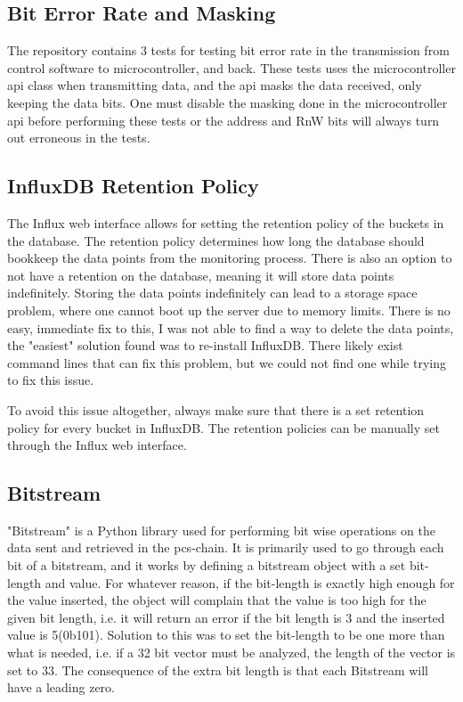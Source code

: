 \documentclass[main.tex]{subfiles}
\begin{document}
\subsection{Bit Error Rate and Masking}

The repository contains 3 tests for testing bit error rate in the transmission from control software to microcontroller, and back. These tests uses the microcontroller \gls{api} class when transmitting data, and the \gls{api} masks the data received, only keeping the data bits. One must disable the masking done in the microcontroller \gls{api} before performing these tests or the address and RnW bits will always turn out erroneous in the tests.

\subsection{InfluxDB Retention Policy}

The Influx web interface allows for setting the retention policy of the buckets in the database. The retention policy determines how long the database should bookkeep the data points from the monitoring process. There is also an option to not have a retention on the database, meaning it will store data points indefinitely. Storing the data points indefinitely can lead to a storage space problem, where one cannot boot up the server due to memory limits. There is no easy, immediate fix to this, I was not able to find a way to delete the data points, the "easiest" solution found was to re-install InfluxDB. There likely exist command lines that can fix this problem, but we could not find one while trying to fix this issue.

To avoid this issue altogether, always make sure that there is a set retention policy for every bucket in InfluxDB. The retention policies can be manually set through the Influx web interface.

\subsection{Bitstream}

"Bitstream" is a Python library used for performing bit wise operations on the data sent and retrieved in the \gls{pcs}-chain. It is primarily used to go through each bit of a bitstream, and it works by defining a bitstream object with a set bit-length and value. For whatever reason, if the bit-length is exactly high enough for the value inserted, the object will complain that the value is too high for the given bit length, i.e. it will return an error if the bit length is 3 and the inserted value is 5(0b101). Solution to this was to set the bit-length to be one more than what is needed, i.e. if a 32 bit vector must be analyzed, the length of the vector is set to 33. The consequence of the extra bit length is that each Bitstream will have a leading zero.
\end{document}
